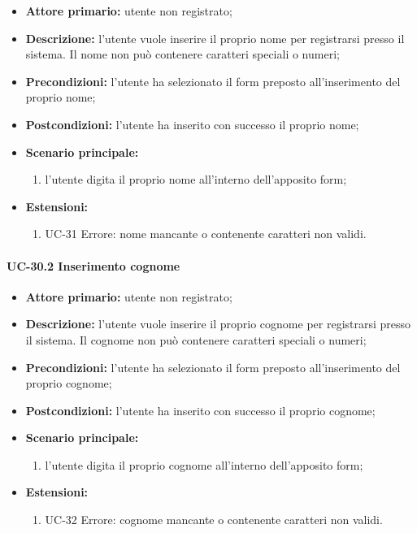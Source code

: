 	\begin{itemize}
		\item \textbf{Attore primario:} utente non registrato;

		\item \textbf{Descrizione:} l'utente vuole inserire il proprio nome per registrarsi presso il sistema. Il nome non può contenere caratteri speciali o numeri;

		\item \textbf{Precondizioni:} l'utente ha selezionato il form preposto all'inserimento del proprio nome;

		\item \textbf{Postcondizioni:} l'utente ha inserito con successo il proprio nome;

		\item \textbf{Scenario principale:}
	  	  \begin{enumerate}
		  	\item l'utente digita il proprio nome all'interno dell'apposito form;
	      \end{enumerate}
		\item \textbf{Estensioni:}
	      \begin{enumerate}
		      \item UC-31 Errore: nome mancante o contenente caratteri non validi.
	      \end{enumerate}
	\end{itemize}

\paragraph{UC-30.2 Inserimento cognome}

	\begin{itemize}
		\item \textbf{Attore primario:} utente non registrato;

		\item \textbf{Descrizione:} l'utente vuole inserire il proprio cognome per registrarsi presso il sistema. Il cognome non può contenere caratteri speciali o numeri;

		\item \textbf{Precondizioni:} l'utente ha selezionato il form preposto all'inserimento del proprio cognome;

		\item \textbf{Postcondizioni:} l'utente ha inserito con successo il proprio cognome;

		\item \textbf{Scenario principale:}
			\begin{enumerate}
		  		\item l'utente digita il proprio cognome all'interno dell'apposito form;
	  		\end{enumerate}
		\item \textbf{Estensioni:}
	  		\begin{enumerate}
		  		\item UC-32 Errore: cognome mancante o contenente caratteri non validi.
	  		\end{enumerate}
	\end{itemize}

